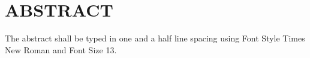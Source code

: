 \chapter*{\uppercase{ABSTRACT}}
The abstract shall be typed in one and a half line spacing using Font Style Times New Roman and Font Size 13.

